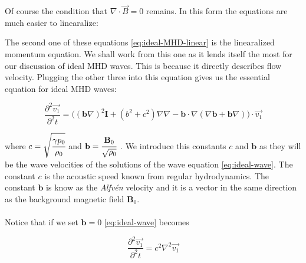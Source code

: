 Of course the condition that $ \nabla \cdot \vec{B} = 0  $ remains. In this form the equations are much easier to linearalize:

{\centering 
\noindent {}
\par}

The second one of these equations \autoref{eq:ideal-MHD-linear} is the linearalized momentum equation. We shall work from this one as it lends itself the most for our discussion of ideal MHD waves. This is because it directly describes flow velocity. Plugging the other three into this equation gives us the essential equation for ideal MHD waves:

\begin{equation}
	\label{eq:ideal-wave}		
		\frac{\partial^2 \vec{v_1}}{\partial^2 t} = \bigg( (\textbf{b} \nabla)^2 \textbf{I} + (b^2 + c^2)\nabla \nabla - \textbf{b} \cdot \nabla (\nabla \textbf{b} + \textbf{b} \nabla) \bigg) \cdot \vec{v_1}
\end{equation}

where $c = \sqrt{\cfrac{\gamma p_0}{\rho_0}}$ and $\textbf{b} = \cfrac{\textbf{B}_0}{\sqrt{\rho_0}}$ . We introduce this constants $c$ and $\textbf{b}$ as they will be the wave velocities of the solutions of the wave equation \autoref{eq:ideal-wave}. The constant $c$ is the acoustic speed known from regular hydrodynamics. The constant $\textbf{b}$ is know as the \textit{Alfvén } velocity and it is a vector in the same direction as the background magnetic field $\textbf{B}_0$.\\
\\
Notice that if we set $\textbf{b} = 0$ \autoref{eq:ideal-wave} becomes

$$ \frac{\partial^2 \vec{v_1}}{\partial^2 t} = c^2 \nabla^2 \vec{v_1} $$

